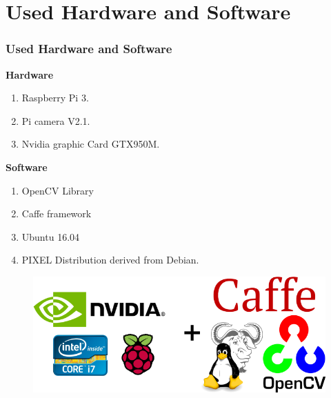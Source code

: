 \documentclass[10pt,a4paper]{beamer}
\begin{document}
\section{Used Hardware and Software}
\begin{frame}
\frametitle{Used Hardware and Software}
\textbf{Hardware}
\begin{enumerate}
\item Raspberry Pi 3.
\item Pi camera V2.1.
\item Nvidia graphic Card GTX950M.
\end{enumerate}
\textbf{Software}
\begin{enumerate}
\item OpenCV Library
\item Caffe framework
\item Ubuntu 16.04
\item PIXEL Distribution derived from Debian.
\end{enumerate}
\begin{figure}[hbtp]
\centering
\includegraphics[scale=0.3]{SoftHard.png}
\end{figure}

\end{frame}
\end{document}
